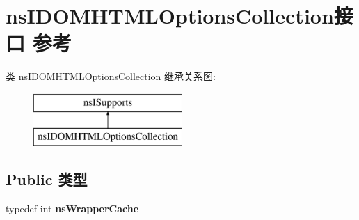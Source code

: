 \hypertarget{interfacens_i_d_o_m_h_t_m_l_options_collection}{}\section{ns\+I\+D\+O\+M\+H\+T\+M\+L\+Options\+Collection接口 参考}
\label{interfacens_i_d_o_m_h_t_m_l_options_collection}
类 ns\+I\+D\+O\+M\+H\+T\+M\+L\+Options\+Collection 继承关系图\+:\begin{figure}[H]
\begin{center}
\leavevmode
\includegraphics[height=2.000000cm]{interfacens_i_d_o_m_h_t_m_l_options_collection}
\end{center}
\end{figure}
\subsection*{Public 类型}
\begin{DoxyCompactItemize}
\item 
\mbox{\label{interfacens_i_d_o_m_h_t_m_l_options_collection_ad7703bbb824cdbffab987fd1756213e2}} 
typedef int {\bfseries ns\+Wrapper\+Cache}
\end{DoxyCompactItemize}
